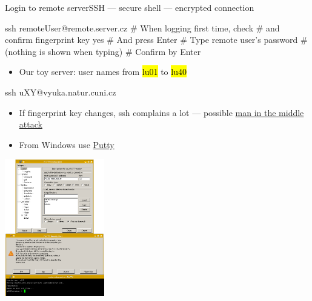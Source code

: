 \documentclass[compress, ucs, xelatex, 11pt, xcolor=svgnames,
  hyperref={
    bookmarks=true,
    unicode=true,
    colorlinks=true,
    pdftitle={Linux, command line and MetaCentrum},
    plainpages=false,
    pdfauthor={Vojtech Zeisek},
    pdfsubject={Course about use of Linux command line, writing shell scripts and using MetaCentrum of CESNET},
    pdfcreator={XeLaTeX},
    pdfkeywords={Linux, GNU, BASH, shell, command line, MetaCentrum},
    linkcolor=DarkRed,
    anchorcolor=DarkBlue,
    citecolor=Indigo,
    filecolor=NavyBlue,
    menucolor=DarkMagenta,
    urlcolor=DarkBlue,
    pdftex},
  url={hyphens, lowtilde} %
  ]{beamer}
\renewcommand{\texttt}[1]{\hl{\ttfamily #1}}
\begin{document}
\begin{frame}[fragile]{Login to remote server}{SSH --- secure shell --- encrypted connection}
  \label{ssh}
\begin{multicols}{2}
  \begin{bashcode}
    ssh remoteUser@remote.server.cz
    # When logging first time, check
    # and confirm fingerprint key
    yes # And press Enter
    # Type remote user's password
    # (nothing is shown when typing)
    # Confirm by Enter
  \end{bashcode}
  \begin{itemize}
    \item Our toy server: user names from \texttt{lu01} to \texttt{lu40}
  \end{itemize}
  \begin{bashcode}
    ssh uXY@vyuka.natur.cuni.cz
  \end{bashcode}
  \begin{itemize}
    \item If fingerprint key changes, ssh complains a lot --- possible \href{https://en.wikipedia.org/wiki/Man-in-the-middle_attack}{man in the middle attack}
    \item From Windows use \href{https://www.putty.org/}{Putty}
  \end{itemize}
  \begin{center}
    \includegraphics[height=6cm]{putty.png}
  \end{center}
\end{multicols}
\end{frame}
\end{document}
